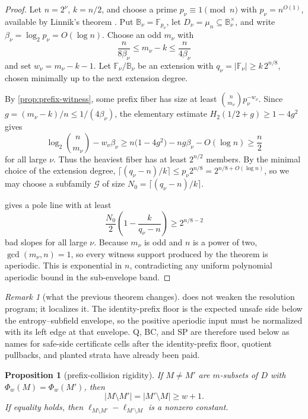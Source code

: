 \documentclass[a4paper,11pt]{amsart}
\newtheorem{proposition}[proposition]{Proposition}
\theoremstyle{remark}
\newtheorem{remark}[remark]{Remark}
\newcommand{\F}{\mathbb F}
\newcommand{\B}{\mathbb B}
\begin{document}
\begin{proof}
Let \(n=2^\nu\), \(k=n/2\), and choose a prime \(p_\nu\equiv1\pmod n\) with \(p_\nu=n^{O(1)}\), available by Linnik's theorem \cite{Linnik44}.  Put \(\B_\nu=\F_{p_\nu}\), let \(D_\nu=\mu_n\subseteq\B_\nu^\times\), and write \(\beta_\nu=\log_2p_\nu=O(\log n)\).  Choose an odd \(m_\nu\) with
\[
        \frac{n}{8\beta_\nu}\le m_\nu-k\le \frac{n}{4\beta_\nu}
\]
and set \(w_\nu=m_\nu-k-1\).  Let \(\F_\nu/\B_\nu\) be an extension with \(q_\nu=|\F_\nu|\ge k\,2^{n/8}\), chosen minimally up to the next extension degree.

By \cref{prop:prefix-witness}, some prefix fiber has size at least \(\binom n{m_\nu}p_\nu^{-w_\nu}\).  Since \(g=(m_\nu-k)/n\le1/(4\beta_\nu)\), the elementary estimate \(H_2(1/2+g)\ge1-4g^2\) gives
\[
        \log_2\binom n{m_\nu}-w_\nu\beta_\nu
        \ge n\bigl(1-4g^2\bigr)-ng\beta_\nu-O(\log n)
        \ge \frac{n}{2}
\]
for all large \(\nu\).  Thus the heaviest fiber has at least \(2^{n/2}\) members.  By the minimal choice of the extension degree, \(\lceil(q_\nu-n)/k\rceil\le p_\nu 2^{n/8}=2^{n/8+O(\log n)}\), so we may choose a subfamily \(\mathcal G\) of size \(N_0=\lceil(q_\nu-n)/k\rceil\).

 gives a pole line with at least
\[
        \frac{N_0}{2}\left(1-\frac{k}{q_\nu-n}\right)\ge 2^{n/8-2}
\]
bad slopes for all large \(\nu\).  Because \(m_\nu\) is odd and \(n\) is a power of two, \(\gcd(m_\nu,n)=1\), so every witness support produced by the theorem is aperiodic.  This is exponential in \(n\), contradicting any uniform polynomial aperiodic bound in the sub-envelope band.
\end{proof}

\begin{remark}[what the previous theorem changes]\label{rem:normalized-band}
 does not weaken the resolution program; it localizes it.  The identity-prefix floor is the expected unsafe side below the entropy--subfield envelope, so the positive aperiodic input must be normalized with its left edge at that envelope.  Q, BC, and SP are therefore used below as names for safe-side certificate cells after the identity-prefix floor, quotient pullbacks, and planted strata have already been paid.
\end{remark}

\begin{proposition}[prefix-collision rigidity]\label{prop:prefix-rigidity}
If \(M\ne M'\) are \(m\)-subsets of \(D\) with \(\Phi_w(M)=\Phi_w(M')\), then
\[
        |M\setminus M'|=|M'\setminus M|\ge w+1.
\]
If equality holds, then \(\ell_{M\setminus M'}-\ell_{M'\setminus M}\) is a nonzero constant.
\end{proposition}
\end{document}
